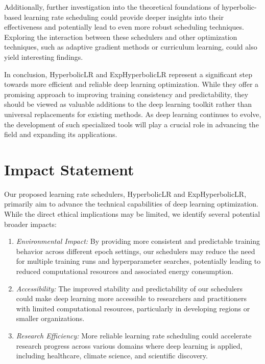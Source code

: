 \documentclass{article}
\theoremstyle{plain}
\theoremstyle{definition}
\theoremstyle{remark}
\begin{document}
Additionally, further investigation into the theoretical foundations of hyperbolic-based learning rate scheduling could provide deeper insights into their effectiveness and potentially lead to even more robust scheduling techniques. Exploring the interaction between these schedulers and other optimization techniques, such as adaptive gradient methods or curriculum learning, could also yield interesting findings.

In conclusion, HyperbolicLR and ExpHyperbolicLR represent a significant step towards more efficient and reliable deep learning optimization. While they offer a promising approach to improving training consistency and predictability, they should be viewed as valuable additions to the deep learning toolkit rather than universal replacements for existing methods. As deep learning continues to evolve, the development of such specialized tools will play a crucial role in advancing the field and expanding its applications.

\section*{Impact Statement}

Our proposed learning rate schedulers, HyperbolicLR and ExpHyperbolicLR, primarily aim to advance the technical capabilities of deep learning optimization. While the direct ethical implications may be limited, we identify several potential broader impacts:

\begin{enumerate}
    \item \textit{Environmental Impact:} By providing more consistent and predictable training behavior across different epoch settings, our schedulers may reduce the need for multiple training runs and hyperparameter searches, potentially leading to reduced computational resources and associated energy consumption.

    \item \textit{Accessibility:} The improved stability and predictability of our schedulers could make deep learning more accessible to researchers and practitioners with limited computational resources, particularly in developing regions or smaller organizations.

    \item \textit{Research Efficiency:} More reliable learning rate scheduling could accelerate research progress across various domains where deep learning is applied, including healthcare, climate science, and scientific discovery.
\end{enumerate}
\end{document}
